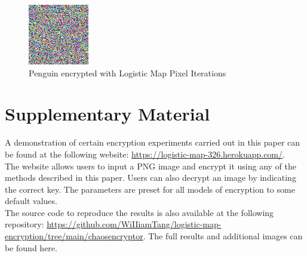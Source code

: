 \documentclass[10pt]{article}
\begin{document}
    
    \begin{figure}[htbp]
    	\centering
    	\includegraphics[width=0.5\columnwidth]{LMapPixelPenguinEncrypted.png}
    	\caption{Penguin encrypted with Logistic Map Pixel Iterations}
    	\label{fig20}
    \end{figure}
    

    
    
    \section{Supplementary Material} \label{sec:supp}
    
    A demonstration of certain encryption experiments carried out in this paper can be found at the following website: \href{https://logistic-map-326.herokuapp.com/}{https://logistic-map-326.herokuapp.com/}.\\
    
    The website allows users to input a PNG image and encrypt it using any of the methods described in this paper. Users can also decrypt an image by indicating the correct key. The parameters are preset for all models of encryption to some default values.\\
    
    The source code to reproduce the results is also available at the following repository: \href{https://github.com/WiIIiamTang/logistic-map-encryption/tree/main/chaosencryptor}{https://github.com/WiIIiamTang/logistic-map-encryption/tree/main/chaosencryptor}. The full results and additional images can be found here.
 
\end{document}
